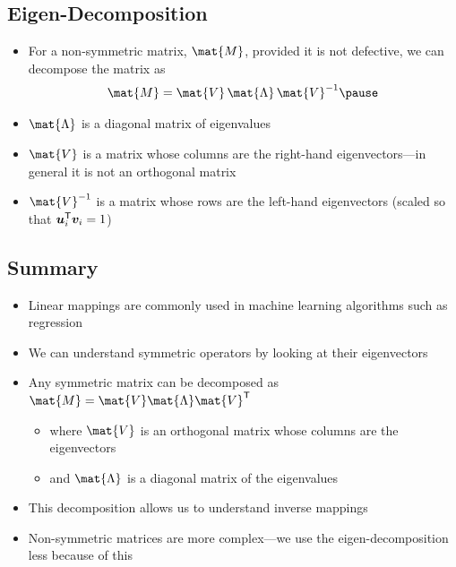 
\begin{slide}
\section{Eigen-Decomposition}

\begin{PauseHighLight}
  \begin{itemize}
  \item For a non-symmetric matrix, $\mat{M}$, provided it is
    not defective, we can decompose the matrix as
    \begin{align*}
      \mat{M} = \mat{V}\,\mat{\Lambda}\,\mat{V}^{-1}\pause
    \end{align*}
  \item $\mat{\Lambda}$ is a diagonal matrix of eigenvalues\pause
  \item $\mat{V}$ is a matrix whose columns are the right-hand
    eigenvectors\pause---in general it is not an orthogonal matrix\pauseb
  \item $\mat{V}^{-1}$ is a matrix whose rows are the left-hand
    eigenvectors\pause{} (scaled so that $\bm{u}_i^{\textsf{T}}\bm{v}_i = 1$)\pauseb
  \end{itemize}
\end{PauseHighLight}

\end{slide}



\begin{slide}
\section[-2]{Summary}

\begin{PauseHighLight}
  \begin{itemize}
  \item Linear mappings are commonly used in machine learning algorithms
    such as regression\pause
  \item We can understand symmetric operators by looking at their eigenvectors\pause
  \item Any symmetric matrix can be decomposed as $\mat{M} = \mat{V}
    \mat{\Lambda} \mat{V}^\tr$
    \begin{itemize}
    \item where $\mat{V}$ is an orthogonal matrix whose columns are the eigenvectors
    \item and $\mat{\Lambda}$ is a diagonal matrix of the eigenvalues\pause
    \end{itemize}
  \item This decomposition allows us to understand inverse
    mappings\pause
  \item Non-symmetric matrices are more complex\pause---we use the
    eigen-decomposition less because of this\pauseb
  \end{itemize}
\end{PauseHighLight}

\end{slide}




